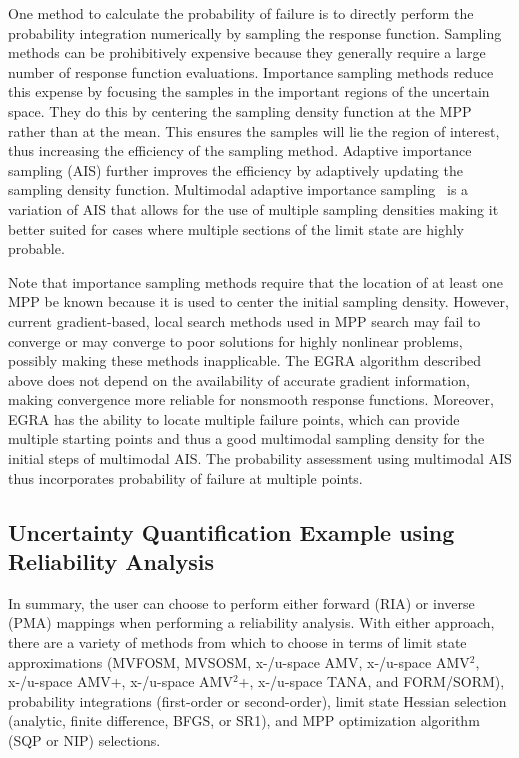 One method to calculate the probability of failure is 
to directly perform the probability 
integration numerically by sampling the response function.
Sampling methods can be 
prohibitively expensive because they generally require a large 
number of response function evaluations.
Importance sampling methods reduce this expense by focusing the samples in 
the important regions of the uncertain space.
They do this by centering the sampling density function at the MPP rather
than at the mean.
This ensures the samples will lie the region of interest, 
thus increasing the efficiency of the sampling method.
Adaptive importance sampling (AIS) further improves the efficiency by 
adaptively updating the sampling density function.
Multimodal adaptive importance sampling~\cite{Dey98} is a 
variation of AIS that allows for the use of multiple sampling densities 
making it better suited for cases where multiple sections of the limit state 
are highly probable.

Note that importance sampling methods require that the location of at least 
one MPP be known because it is used to center the initial sampling density.
However, current gradient-based, local search methods used in MPP search may 
fail to converge or may converge to poor solutions for 
highly nonlinear problems, possibly making these methods inapplicable.
The EGRA algorithm described above does 
not depend on the availability of accurate gradient information, making
convergence more reliable for nonsmooth response functions.
Moreover, EGRA has the ability to locate multiple failure points, which 
can provide multiple starting points and thus a good multimodal sampling density for the initial steps of multimodal AIS. The probability assessment 
using multimodal AIS thus incorporates probability of failure at 
multiple points.

\subsection{Uncertainty Quantification Example using Reliability Analysis} \label{uq:reliability:ex}

In summary, the user can choose to perform either forward (RIA) or
inverse (PMA) mappings when performing a reliability analysis. With
either approach, there are a variety of methods from which to choose
in terms of limit state approximations (MVFOSM, MVSOSM, x-/u-space
AMV, x-/u-space AMV$^2$, x-/u-space AMV+, x-/u-space AMV$^2$+,
x-/u-space TANA, and FORM/SORM), probability integrations
(first-order or second-order), limit state Hessian selection
(analytic, finite difference, BFGS, or SR1), and MPP optimization
algorithm (SQP or NIP) selections.

